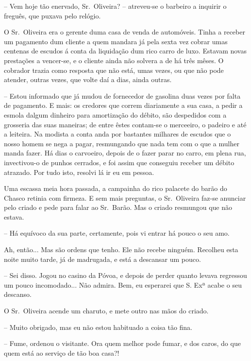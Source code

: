 \documentclass[9pt]{article}
\begin{document}
-- Vem hoje tão enervado, Sr.\ Oliveira? -- atreveu-se o barbeiro a inquirir o freguês, que puxava pelo relógio.

O Sr.\ Oliveira era o gerente duma casa de venda de automóveis. Tinha
a receber um pagamento dum cliente a quem mandara já pela sexta vez cobrar
umas centenas de escudos á conta da liquida\-ção dum rico carro de luxo. Estavam novas presta\-ções a vencer-se, e o cliente ainda não solvera a de há três
mêses. O cobrador trazia como resposta que não está, umas vezes, ou que não
pode atender, outras vezes, que volte daí a dias, ainda outras.

-- Estou informado que já mudou de fornecedor de gasolina duas vezes por
falta de pagamento. E mais: os credores que correm diariamente a sua casa, a
pedir a esmola dalgum dinheiro para amortiza\-ção do débito, são despedidos com
a grosseria das suas maneiras; de entre êstes contam-se o merceeiro, o padeiro e até a  leiteira. Na modista a conta anda por bastantes mi\-lhares de escudos que o nosso homem se nega a pagar, resmungando que nada tem com o que
a mu\-lher manda fazer. Há dias o carvoeiro, depois de o fazer parar no carro,
em plena rua, invectivou-o de punhos cerrados, e foi assim que conseguiu receber um débito atrazado. Por tudo isto, resolvi lá ir eu em pessoa.


Uma escassa meia hora passada, a campainha do rico palacete do barão do
Chasco retinia com firmeza. E sem mais preguntas, o Sr.\ Oliveira faz-se anunciar pelo criado e pede para falar ao Sr.\ Barão. Mas o criado resmungou que
não estava.

-- Há equívoco da sua parte, certamente, pois vi entrar há pouco o seu amo.

Ah, então... Mas são ordens que tenho. Ele não recebe nin\-guém. Reco\-lheu esta noite muito tarde, já de madrugada, e está a descansar um pouco.

-- Sei disso. Jogou no casino da Póvoa, e depois de perder quanto levava
regressou um pouco incomodado... Não admira. Bem, eu esperarei que S. Exª
acabe o seu descanso.

O Sr.\ Oliveira acende um charuto, e mete outro nas mãos do criado.

-- Muito obrigado, mas eu não estou habituado a coisa tão fina.

-- Fume, ordenou o visitante. Ora quem me\-lhor pode fumar, e dos caros, do
que quem está ao serviço de tão boa casa?!
\end{document}
